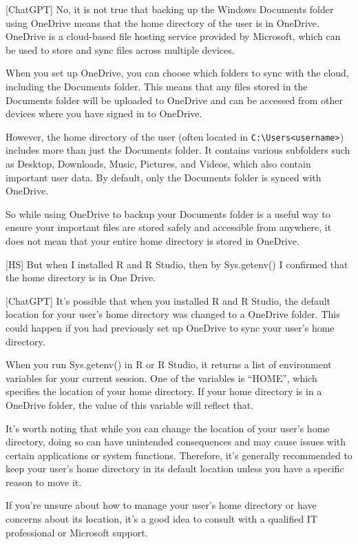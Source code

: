 \documentclass[
]{bxjsbook}
\theoremstyle{definition}
\theoremstyle{definition}
\theoremstyle{definition}
\theoremstyle{definition}
\theoremstyle{remark}
\begin{document}
{[}ChatGPT{]} No, it is not true that backing up the Windows Documents folder using OneDrive means that the home directory of the user is in OneDrive. OneDrive is a cloud-based file hosting service provided by Microsoft, which can be used to store and sync files across multiple devices.

When you set up OneDrive, you can choose which folders to sync with the cloud, including the Documents folder. This means that any files stored in the Documents folder will be uploaded to OneDrive and can be accessed from other devices where you have signed in to OneDrive.

However, the home directory of the user (often located in \texttt{C:\textbackslash{}Users\textless{}username\textgreater{}}) includes more than just the Documents folder. It contains various subfolders such as Desktop, Downloads, Music, Pictures, and Videos, which also contain important user data. By default, only the Documents folder is synced with OneDrive.

So while using OneDrive to backup your Documents folder is a useful way to ensure your important files are stored safely and accessible from anywhere, it does not mean that your entire home directory is stored in OneDrive.

{[}HS{]} But when I installed R and R Studio, then by Sys.getenv() I confirmed that the home directory is in One Drive.

{[}ChatGPT{]} It's possible that when you installed R and R Studio, the default location for your user's home directory was changed to a OneDrive folder. This could happen if you had previously set up OneDrive to sync your user's home directory.

When you run Sys.getenv() in R or R Studio, it returns a list of environment variables for your current session. One of the variables is ``HOME'', which specifies the location of your home directory. If your home directory is in a OneDrive folder, the value of this variable will reflect that.

It's worth noting that while you can change the location of your user's home directory, doing so can have unintended consequences and may cause issues with certain applications or system functions. Therefore, it's generally recommended to keep your user's home directory in its default location unless you have a specific reason to move it.

If you're unsure about how to manage your user's home directory or have concerns about its location, it's a good idea to consult with a qualified IT professional or Microsoft support.
\end{document}
